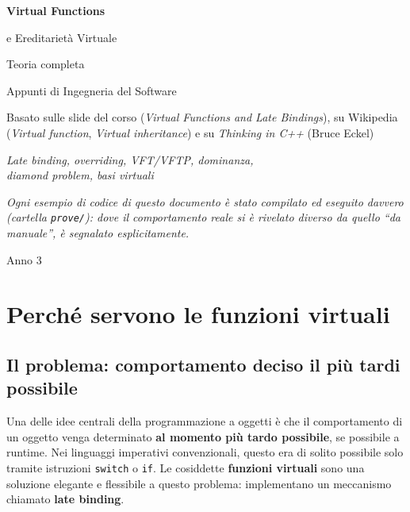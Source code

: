 \documentclass{report}
\newcommand{\code}[1]{\texttt{\small #1}}
\begin{document}
\begin{titlepage}
    \centering
    \vspace*{2.3cm}
    {\Huge\sffamily\bfseries Virtual Functions\par}
    \vspace{0.3cm}
    {\LARGE\sffamily e Ereditarietà Virtuale\par}
    \vspace{0.5cm}
    {\LARGE\sffamily Teoria completa\par}
    \vspace{1.2cm}
    {\Large Appunti di Ingegneria del Software\par}
    \vspace{0.4cm}
    {\large Basato sulle slide del corso (\emph{Virtual Functions and Late
    Bindings}), su Wikipedia (\emph{Virtual function}, \emph{Virtual
    inheritance}) e su \emph{Thinking in C++} (Bruce Eckel)\par}
    \vspace{1.6cm}
    {\large\itshape Late binding, overriding, VFT/VFTP, dominanza,\\
    diamond problem, basi virtuali\par}
    \vspace{0.6cm}
    {\footnotesize\itshape Ogni esempio di codice di questo documento è
    stato compilato ed eseguito davvero (cartella \code{prove/}): dove il
    comportamento reale si è rivelato diverso da quello ``da manuale'',
    è segnalato esplicitamente.\par}
    \vfill
    {\large Anno 3\par}
\end{titlepage}

\tableofcontents
\newpage

\chapter{Perché servono le funzioni virtuali}\label{ch:intro}

\section{Il problema: comportamento deciso il più tardi possibile}

Una delle idee centrali della programmazione a oggetti è che il
comportamento di un oggetto venga determinato \textbf{al momento più
tardo possibile}, se possibile a runtime. Nei linguaggi imperativi
convenzionali, questo era di solito possibile solo tramite istruzioni
\code{switch} o \code{if}. Le cosiddette \textbf{funzioni virtuali} sono
una soluzione elegante e flessibile a questo problema: implementano un
meccanismo chiamato \textbf{late binding}.
\end{document}
